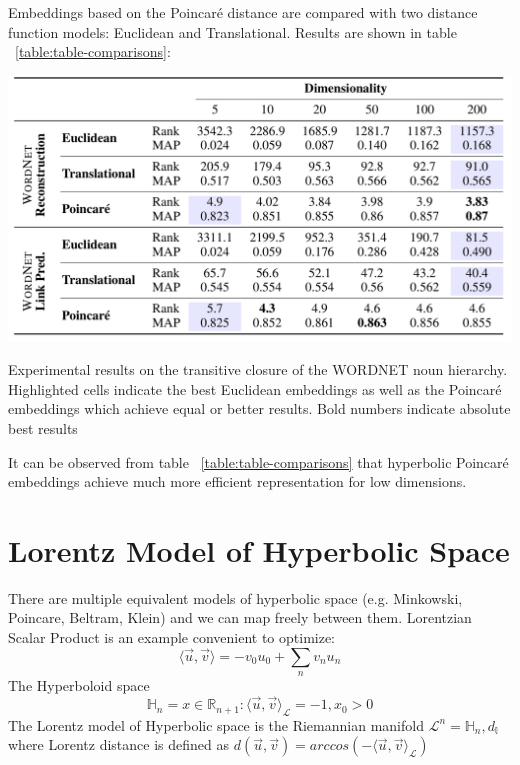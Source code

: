 Embeddings based on the Poincaré distance are compared with two distance function models: Euclidean and Translational. Results are shown in table ~\ref{table:table-comparisons}:

\begin{table}[htb]
  \centering
    \includegraphics[width=\textwidth]{lectures/11-b/Images/1-3.png}
    \caption{Experimental results on the transitive closure of the WORDNET noun hierarchy. Highlighted cells indicate the best Euclidean embeddings as well as the Poincaré embeddings which achieve equal or better results. Bold numbers indicate absolute best results}
    \label{table:table-comparisons}
\end{table}

It can be observed from table  ~\ref{table:table-comparisons} that hyperbolic Poincaré embeddings achieve much more efficient representation for low dimensions. 

\section{Lorentz Model of Hyperbolic Space}

There are multiple equivalent models of hyperbolic space (e.g. Minkowski, Poincare, Beltram, Klein) and we can map freely between them. Lorentzian Scalar Product is an example convenient to optimize:
\begin{equation} \label{eq:riemmaniansdg3}
         \langle \vec{u},\vec{v} \rangle = -v_0 u_0 + \sum_n v_n u_n
\end{equation}  
The Hyperboloid space 
\begin{equation} \label{eq:riemmaniansdg4}
         \mathbb{H}_n = {x \in \mathbb{R}_{n+1}:\langle \vec{u},\vec{v} \rangle_{ \mathcal{L}}= -1, x_0 > 0 }
\end{equation}  
The Lorentz model of Hyperbolic space is the Riemannian manifold  $\mathcal{L}^n =  \mathbb{H}_n , d_{\mathbb{l}}$
where Lorentz distance is defined as $d(\vec{u},\vec{v}) = arccos (-\langle \vec{u},\vec{v} \rangle_{ \mathcal{L}}) $

